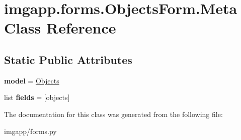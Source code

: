 \hypertarget{classimgapp_1_1forms_1_1ObjectsForm_1_1Meta}{}\section{imgapp.\+forms.\+Objects\+Form.\+Meta Class Reference}
\label{classimgapp_1_1forms_1_1ObjectsForm_1_1Meta}
\subsection*{Static Public Attributes}
\begin{DoxyCompactItemize}
\item 
\mbox{\label{classimgapp_1_1forms_1_1ObjectsForm_1_1Meta_a670d599bf35884755d8c2ea9328b7846}} 
{\bfseries model} = \hyperlink{classimgapp_1_1models_1_1Objects}{Objects}
\item 
\mbox{\label{classimgapp_1_1forms_1_1ObjectsForm_1_1Meta_ad4bbec63ff76ff6de2b397c72db8a8f6}} 
list {\bfseries fields} = \mbox{[}\textquotesingle{}objects\textquotesingle{}\mbox{]}
\end{DoxyCompactItemize}


The documentation for this class was generated from the following file\+:\begin{DoxyCompactItemize}
\item 
imgapp/forms.\+py\end{DoxyCompactItemize}
